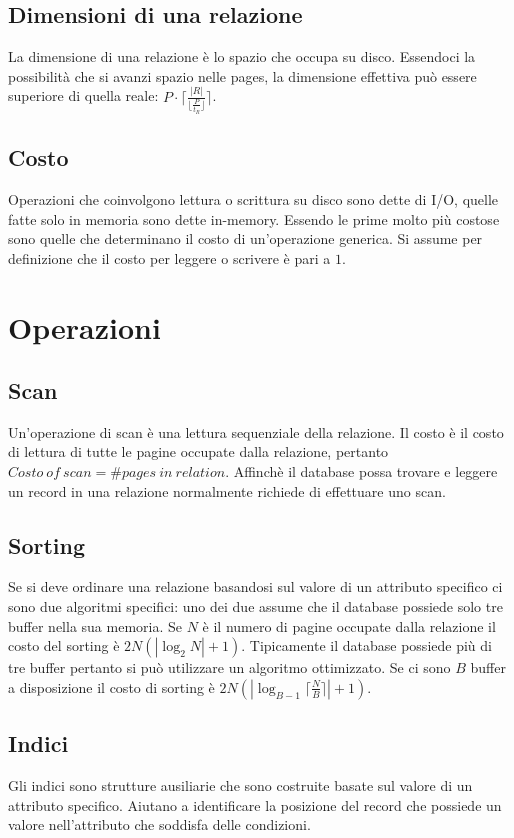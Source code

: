 \subsection{Dimensioni di una relazione}
La dimensione di una relazione \`e lo spazio che occupa su disco. Essendoci la possibilit\`a che si avanzi spazio nelle pages, la dimensione effettiva pu\`o
essere superiore di quella reale: $P\cdot\lceil\frac{|R|}{\lfloor\frac{P}{t_R}\rfloor}\rceil$.
\subsection{Costo}
Operazioni che coinvolgono lettura o scrittura su disco sono dette di I/O, quelle fatte solo in memoria sono dette in-memory. Essendo le prime molto pi\`u costose sono quelle che determinano il costo di 
un'operazione generica. Si assume per definizione che il costo per leggere o scrivere \`e pari a $1$. 
\section{Operazioni}
\subsection{Scan}
Un'operazione di scan \`e una lettura sequenziale della relazione. Il costo \`e il costo di lettura di tutte le pagine occupate dalla relazione, pertanto $Costo\ of\ scan= \# pages\ in\ relation$. Affinch\`e il database
possa trovare e leggere un record in una relazione normalmente richiede di effettuare uno scan. 
\subsection{Sorting}
Se si deve ordinare una relazione basandosi sul valore di un attributo specifico ci sono due algoritmi specifici: uno dei due assume che il database possiede solo tre buffer nella sua memoria. Se $N$ \`e il numero di
pagine occupate dalla relazione il costo del sorting \`e $2N(|\log_2 N|+1)$. Tipicamente il database possiede pi\`u di tre buffer pertanto si pu\`o utilizzare un algoritmo ottimizzato. Se ci sono $B$ buffer a 
disposizione il costo di sorting \`e $2N(|\log_{B-1}\lceil \frac{N}{B}\rceil|+1)$.
\subsection{Indici}
Gli indici sono strutture ausiliarie che sono costruite basate sul valore di un attributo specifico. Aiutano a identificare la posizione del record che possiede un valore nell'attributo che soddisfa delle condizioni. 
